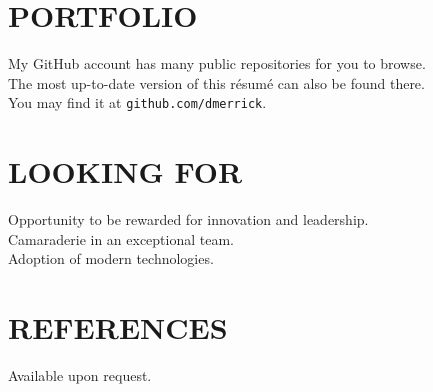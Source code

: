 \documentclass[line,margin]{res}
\begin{document}
\begin{resume}
\section{PORTFOLIO}
  My GitHub account has many public repositories for you to browse. \\
  The most up-to-date version of this r\'{e}sum\'{e} can also be found there. \\
  You may find it at \texttt{github.com/dmerrick}.

\section{LOOKING FOR}
  Opportunity to be rewarded for innovation and leadership. \\
  Camaraderie in an exceptional team. \\
  Adoption of modern technologies.

\section{REFERENCES}
  Available upon request.

\end{resume}
\end{document}

